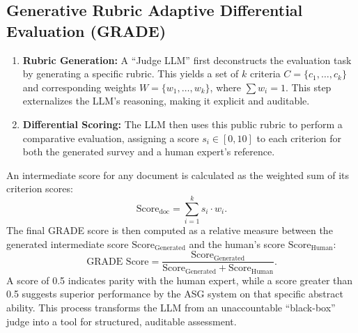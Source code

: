 \documentclass[11pt]{article}
\begin{document}
\subsection{Generative Rubric Adaptive Differential Evaluation (GRADE)}
\label{sec:grade}

\begin{enumerate}[leftmargin=0.5cm, itemsep=0pt, parsep=0pt]
    \item \textbf{Rubric Generation:} A ``Judge LLM'' first deconstructs the evaluation task by generating a specific rubric. This yields a set of $k$ criteria $C=\{c_1, \dots, c_k\}$ and corresponding weights $W=\{w_1, \dots, w_k\}$, where $\sum w_i = 1$. This step externalizes the LLM's reasoning, making it explicit and auditable.

    \item \textbf{Differential Scoring:} The LLM then uses this public rubric to perform a comparative evaluation, assigning a score $s_i \in [0, 10]$ to each criterion for both the generated survey and a human expert's reference.
\end{enumerate}

An intermediate score for any document is calculated as the weighted sum of its criterion scores:
{
\setlength{\abovedisplayskip}{6pt}%
\setlength{\belowdisplayskip}{6pt}%
\begin{equation}
\label{eq:grade_intermediate_score}
\text{Score}_{\text{doc}} = \sum_{i=1}^{k} s_i \cdot w_i.
\end{equation}
}
The final GRADE score is then computed as a relative measure between the generated intermediate score $\text{Score}_{\text{Generated}}$ and the human's score $\text{Score}_{\text{Human}}$:
{
\setlength{\abovedisplayskip}{6pt}%
\setlength{\belowdisplayskip}{6pt}%
\begin{equation}
\label{eq:grade_final_score}
\text{GRADE Score} = \frac{\text{Score}_{\text{Generated}}}{\text{Score}_{\text{Generated}} + \text{Score}_{\text{Human}}}.
\end{equation}
}
A score of 0.5 indicates parity with the human expert, while a score greater than 0.5 suggests superior performance by the ASG system on that specific abstract ability. This process transforms the LLM from an unaccountable ``black-box'' judge into a tool for structured, auditable assessment. 

\end{document}
